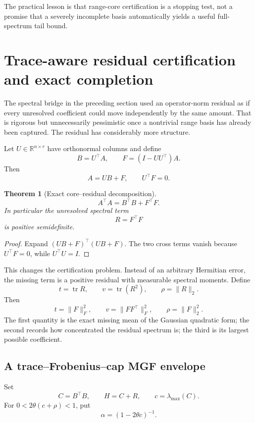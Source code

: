\documentclass[11pt]{article}
\newtheorem{theorem}{Theorem}[section]
\theoremstyle{definition}
\theoremstyle{remark}
\begin{document}
The practical lesson is that range-core certification is a stopping test, not
a promise that a severely incomplete basis automatically yields a useful
full-spectrum tail bound.


\section{Trace-aware residual certification and exact completion}\label{sec:final-23}

The spectral bridge in the preceding section used an operator-norm residual as
if every unresolved coefficient could move independently by the same amount.
That is rigorous but unnecessarily pessimistic once a nontrivial range basis
has already been captured.  The residual has considerably more structure.

Let \(U\in\mathbb R^{n\times r}\) have orthonormal columns and define
\[
B=U^\top A,
\qquad
F=(I-UU^\top)A.
\]
Then
\[
A=UB+F,
\qquad
U^\top F=0.
\]

\begin{theorem}[Exact core--residual decomposition]\label{claim:final-23-1}
\[
\boxed{
A^\top A
=
B^\top B+F^\top F.
}
\]
In particular the unresolved spectral term
\[
R=F^\top F
\]
is positive semidefinite.
\end{theorem}

\begin{proof}
Expand \((UB+F)^\top(UB+F)\).  The two cross terms vanish because
\(U^\top F=0\), while \(U^\top U=I\).
\end{proof}

This changes the certification problem.  Instead of an arbitrary Hermitian
error, the missing term is a positive residual with measurable spectral
moments.  Define
\[
t=\operatorname{tr}R,
\qquad
v=\operatorname{tr}(R^2),
\qquad
\rho=\|R\|_2.
\]
Then
\[
\boxed{
 t=\|F\|_F^2,
 \qquad
 v=\|FF^\top\|_F^2,
 \qquad
 \rho=\|F\|_2^2.
}
\]
The first quantity is the exact missing mean of the Gaussian quadratic form;
the second records how concentrated the residual spectrum is; the third is its
largest possible coefficient.

\subsection{A trace--Frobenius--cap MGF envelope}

Set
\[
C=B^\top B,
\qquad
H=C+R,
\qquad
c=\lambda_{\max}(C).
\]
For \(0<2\theta(c+\rho)<1\), put
\[
\alpha=(1-2\theta c)^{-1}.
\]
\end{document}
